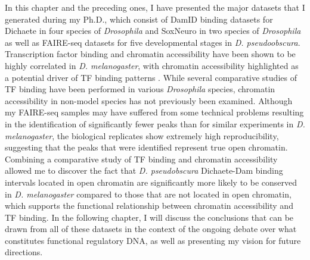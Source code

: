 In this chapter and the preceding ones, I have presented the major datasets that I generated during my Ph.D., which consist of DamID binding datasets for Dichaete in four species of \emph{Drosophila} and SoxNeuro in two species of \emph{Drosophila} as well as FAIRE-seq datasets for five developmental stages in \emph{D. pseudoobscura}. Transcription factor binding and chromatin accessibility have been shown to be highly correlated in \emph{D. melanogaster}, with chromatin accessibility highlighted as a potential driver of TF binding patterns \citep{kaplan_quantitative_2011, li_role_2011}. While several comparative studies of TF binding have been performed in various \emph{Drosophila} species, chromatin accessibility in non-model species has not previously been examined. Although my FAIRE-seq samples may have suffered from some technical problems resulting in the identification of significantly fewer peaks than for similar experiments in \emph{D. melanogaster}, the biological replicates show extremely high reproducibility, suggesting that the peaks that were identified represent true open chromatin. Combining a comparative study of TF binding and chromatin accessibility allowed me to discover the fact that \emph{D. pseudobscura} Dichaete-Dam binding intervals located in open chromatin are significantly more likely to be conserved in \emph{D. melanogaster} compared to those that are not located in open chromatin, which supports the functional relationship between chromatin accessibility and TF binding. In the following chapter, I will discuss the conclusions that can be drawn from all of these datasets in the context of the ongoing debate over what constitutes functional regulatory DNA, as well as presenting my vision for future directions.
